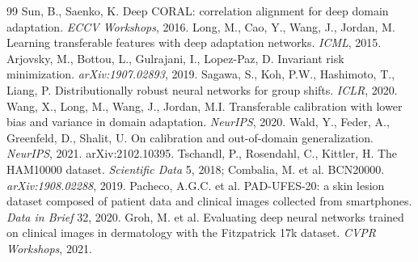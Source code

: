 \documentclass[11pt,a4paper]{article}
\begin{document}
\begin{thebibliography}{99}
 Sun, B., Saenko, K. Deep CORAL: correlation alignment for
deep domain adaptation. \emph{ECCV Workshops}, 2016.
 Long, M., Cao, Y., Wang, J., Jordan, M. Learning transferable
features with deep adaptation networks. \emph{ICML}, 2015.
 Arjovsky, M., Bottou, L., Gulrajani, I., Lopez-Paz, D.
Invariant risk minimization. \emph{arXiv:1907.02893}, 2019.
 Sagawa, S., Koh, P.W., Hashimoto, T., Liang, P.
Distributionally robust neural networks for group shifts. \emph{ICLR}, 2020.
 Wang, X., Long, M., Wang, J., Jordan, M.I. Transferable
calibration with lower bias and variance in domain adaptation. \emph{NeurIPS}, 2020.
 Wald, Y., Feder, A., Greenfeld, D., Shalit, U. On
calibration and out-of-domain generalization. \emph{NeurIPS}, 2021.
arXiv:2102.10395.
 Tschandl, P., Rosendahl, C., Kittler, H. The HAM10000
dataset. \emph{Scientific Data} 5, 2018; Combalia, M. et al. BCN20000.
\emph{arXiv:1908.02288}, 2019.
 Pacheco, A.G.C. et al. PAD-UFES-20: a skin lesion
dataset composed of patient data and clinical images collected from
smartphones. \emph{Data in Brief} 32, 2020.
 Groh, M. et al. Evaluating deep neural networks trained on
clinical images in dermatology with the Fitzpatrick 17k dataset.
\emph{CVPR Workshops}, 2021.
\end{thebibliography}
\end{document}
